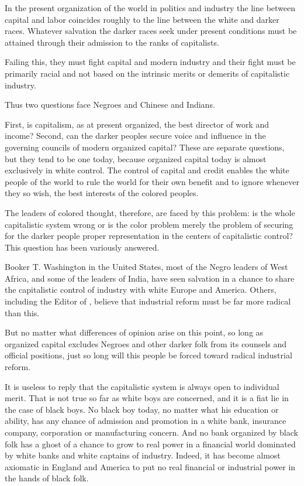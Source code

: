 \documentclass[letterpaper,10pt,english]{jupyterBook}
\begin{document}
\sphinxAtStartPar
In the present organization of the world in politics and industry the line between capital and labor coincides roughly to the line between the white and darker races. Whatever salvation the darker races seek under present conditions must be attained through their admission to the ranks of capitalists.

\sphinxAtStartPar
Failing this, they must fight capital and modern industry and their fight must be primarily racial and not based on the intrinsic merits or demerits of capitalistic industry.

\sphinxAtStartPar
Thus two questions face Negroes and Chinese and Indians.

\sphinxAtStartPar
First, is capitalism, as at present organized, the best director of work and income? Second, can the darker peoples secure voice and influence in the governing councils of modern organized capital? These are separate questions, but they tend to be one today, because organized capital today is almost exclusively in white control. The control of capital and credit enables the white people of the world to rule the world for their own benefit and to ignore whenever they so wish, the best interests of the colored peoples.

\sphinxAtStartPar
The leaders of colored thought, therefore, are faced by this problem: is the whole capitalistic system wrong or is the color problem merely the problem of securing for the darker people proper representation in the centers of capitalistic control? This question has been variously answered.

\sphinxAtStartPar
Booker T. Washington in the United States, most of the Negro leaders of West Africa, and some of the leaders of India, have seen salvation in a chance to share the capitalistic control of industry with white Europe and America. Others, including the Editor of , believe that industrial reform must be far more radical than this.

\sphinxAtStartPar
But no matter what differences of opinion arise on this point, so long as organized capital excludes Negroes and other darker folk from its counsels and official positions, just so long will this people be forced toward radical industrial reform.

\sphinxAtStartPar
It is useless to reply that the capitalistic system is always open to individual merit. That is not true so far as white boys are concerned, and it is a fiat lie in the case of black boys. No black boy today, no matter what his education or ability, has any chance of admission and promotion in a white bank, insurance company, corporation or manufacturing concern. And no bank organized by black folk has a ghost of a chance to grow to real power in a financial world dominated by white banks and white captains of industry. Indeed, it has become almost axiomatic in England and America to put no real financial or industrial power in the hands of black folk.
\end{document}
